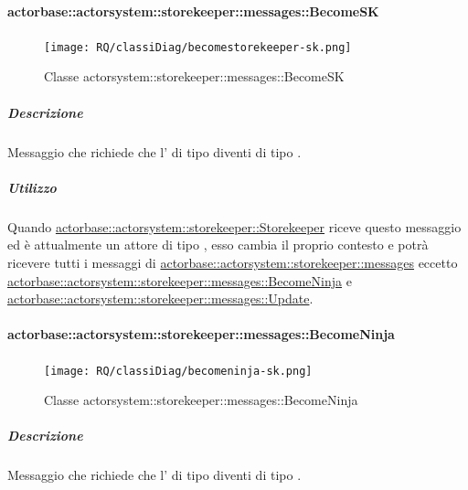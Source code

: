 \documentclass{scalatekids-article}
\begin{document}
\paragraph{actorbase::actorsystem::storekeeper::messages::BecomeSK}
\label{sec:actorbase::actorsystem::storekeeper::messages::BecomeSK}

\begin{figure}[H]
   \begin{center}
     \texttt{[image: RQ/classiDiag/becomestorekeeper-sk.png]}
     \caption{Classe actorsystem::storekeeper::messages::BecomeSK}
   \end{center}
 \end{figure}

\subparagraph{Descrizione}

Messaggio che richiede che l' di tipo  diventi di tipo
.

\subparagraph{Utilizzo}
Quando \hyperref[sec:actorbase::actorsystem::storekeeper::Storekeeper]{actorbase::actorsystem::storekeeper::Storekeeper}
riceve questo messaggio ed è attualmente un attore di tipo ,
esso cambia il proprio contesto e potrà ricevere tutti i messaggi
di \hyperref[sec:actorbase::actorsystem::storekeeper::messages]{actorbase::\allowbreak{}actorsystem::\allowbreak{}storekeeper::\allowbreak{}messages}
eccetto \hyperref[sec:actorbase::actorsystem::storekeeper::messages::BecomeNinja]{actorbase::\allowbreak{}actorsystem::\allowbreak{}storekeeper::\allowbreak{}messages::\allowbreak{}BecomeNinja} e
\hyperref[sec:actorbase::actorsystem::storekeeper::messages::Update]{actorbase::\allowbreak{}actorsystem::\allowbreak{}storekeeper::\allowbreak{}messages::\allowbreak{}Update}.

\paragraph{actorbase::actorsystem::storekeeper::messages::BecomeNinja}
\label{sec:actorbase::actorsystem::storekeeper::messages::BecomeNinja}

\begin{figure}[H]
   \begin{center}
     \texttt{[image: RQ/classiDiag/becomeninja-sk.png]}
     \caption{Classe actorsystem::storekeeper::messages::BecomeNinja}
   \end{center}
 \end{figure}

\subparagraph{Descrizione}
Messaggio che richiede che l' di tipo  diventi di tipo
.
\end{document}
